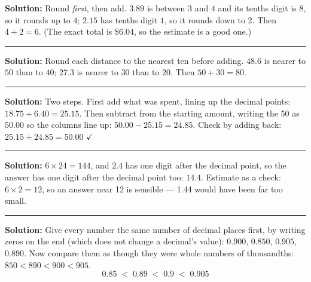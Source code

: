 \documentclass[12pt]{article}
\begin{document}




\textbf{Solution:} Round \emph{first}, then add. $3.89$ is between $3$ and $4$ and
its tenths digit is $8$, so it rounds up to $4$; $2.15$ has tenths digit $1$, so it
rounds down to $2$. Then $4 + 2 = 6$.
(The exact total is $\$6.04$, so the estimate is a good one.)

\vspace{0.2cm}\noindent\rule{\linewidth}{0.2pt}


\textbf{Solution:} Round each distance to the nearest ten before adding.
$48.6$ is nearer to $50$ than to $40$; $27.3$ is nearer to $30$ than to $20$.
Then $50 + 30 = 80$.

\vspace{0.2cm}\noindent\rule{\linewidth}{0.2pt}


\textbf{Solution:} Two steps. First add what was spent, lining up the decimal points:
$18.75 + 6.40 = 25.15$. Then subtract from the starting amount, writing the 50 as
$50.00$ so the columns line up: $50.00 - 25.15 = 24.85$.
Check by adding back: $25.15 + 24.85 = 50.00$ $\checkmark$

\vspace{0.2cm}\noindent\rule{\linewidth}{0.2pt}


\textbf{Solution:} $6 \times 24 = 144$, and $2.4$ has one digit after the decimal
point, so the answer has one digit after the decimal point too: $14.4$.
Estimate as a check: $6 \times 2 = 12$, so an answer near 12 is sensible --- 1.44
would have been far too small.

\vspace{0.2cm}\noindent\rule{\linewidth}{0.2pt}


\textbf{Solution:} Give every number the same number of decimal places first, by
writing zeros on the end (which does not change a decimal's value):
$0.900$, $0.850$, $0.905$, $0.890$. Now compare them as though they were whole
numbers of thousandths: $850 < 890 < 900 < 905$.
\[ \boxed{0.85 \;<\; 0.89 \;<\; 0.9 \;<\; 0.905} \]
\end{document}

